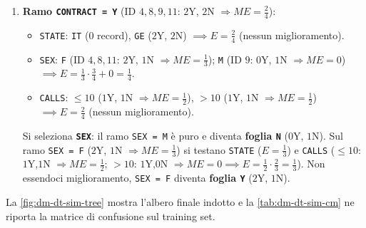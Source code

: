 \begin{enumerate}
    \item \textbf{Ramo \texttt{CONTRACT = Y}} (ID $4,8,9,11$: $2$Y, $2$N $\Rightarrow ME = \frac{2}{4}$):
    \begin{itemize}
        \item \texttt{STATE}: \texttt{IT} ($0$ record), \texttt{GE} ($2$Y, $2$N) $\implies E = \frac{2}{4}$ (nessun miglioramento).
        \item \texttt{SEX}: \texttt{F} (ID $4,8,11$: $2$Y, $1$N $\Rightarrow ME = \frac{1}{3}$); \texttt{M} (ID $9$: $0$Y, $1$N $\Rightarrow ME = 0$) $\implies E = \frac{1}{3}\cdot\frac{3}{4} + 0 = \frac{1}{4}$.
        \item \texttt{CALLS}: $\le 10$ ($1$Y, $1$N $\Rightarrow ME = \frac{1}{2}$), $> 10$ ($1$Y, $1$N $\Rightarrow ME = \frac{1}{2}$) $\implies E = \frac{2}{4}$ (nessun miglioramento).
    \end{itemize}
    Si seleziona \textbf{\texttt{SEX}}: il ramo \texttt{SEX = M} \`e puro e diventa \textbf{foglia \texttt{N}} ($0$Y, $1$N). Sul ramo \texttt{SEX = F} ($2$Y, $1$N $\Rightarrow ME = \frac{1}{3}$) si testano \texttt{STATE} ($E = \frac{1}{3}$) e \texttt{CALLS} ($\le 10$: $1$Y,$1$N $\Rightarrow ME = \frac{1}{2}$; $>10$: $1$Y,$0$N $\Rightarrow ME = 0 \implies E = \frac{1}{2}\cdot\frac{2}{3} = \frac{1}{3}$). Non essendoci miglioramento, \texttt{SEX = F} diventa \textbf{foglia \texttt{Y}} ($2$Y, $1$N).
\end{enumerate}

La \autoref{fig:dm-dt-sim-tree} mostra l'albero finale indotto e la \autoref{tab:dm-dt-sim-cm} ne riporta la matrice di confusione sul training set.

